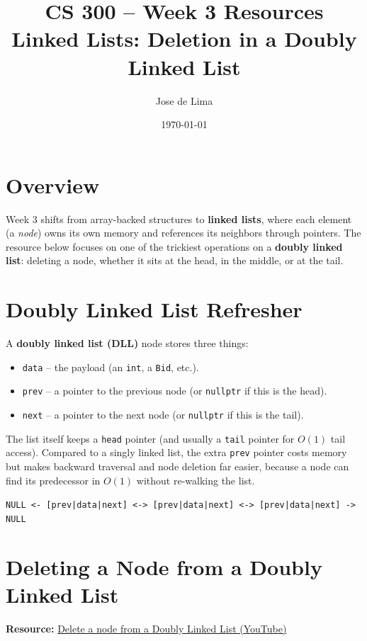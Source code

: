 \documentclass[11pt]{article}
\title{CS 300 -- Week 3 Resources\\\large Linked Lists: Deletion in a Doubly Linked List}
\author{Jose de Lima}
\date{\today}
\begin{document}
\maketitle

\section*{Overview}
Week 3 shifts from array-backed structures to \textbf{linked lists}, where
each element (a \emph{node}) owns its own memory and references its neighbors
through pointers. The resource below focuses on one of the trickiest
operations on a \textbf{doubly linked list}: deleting a node, whether it
sits at the head, in the middle, or at the tail.

\section{Doubly Linked List Refresher}

A \textbf{doubly linked list (DLL)} node stores three things:
\begin{itemize}[leftmargin=*]
    \item \texttt{data} -- the payload (an \texttt{int}, a \texttt{Bid}, etc.).
    \item \texttt{prev} -- a pointer to the previous node (or \texttt{nullptr}
          if this is the head).
    \item \texttt{next} -- a pointer to the next node (or \texttt{nullptr} if
          this is the tail).
\end{itemize}

The list itself keeps a \texttt{head} pointer (and usually a \texttt{tail}
pointer for $O(1)$ tail access). Compared to a singly linked list, the extra
\texttt{prev} pointer costs memory but makes backward traversal and node
deletion far easier, because a node can find its predecessor in $O(1)$
without re-walking the list.

\begin{center}
\texttt{NULL <- [prev|data|next] <-> [prev|data|next] <-> [prev|data|next] -> NULL}
\end{center}

\section{Deleting a Node from a Doubly Linked List}
\textbf{Resource:} \href{https://www.youtube.com/watch?v=LvUgew66zOQ}{Delete a node from a Doubly Linked List (YouTube)}
\end{document}
